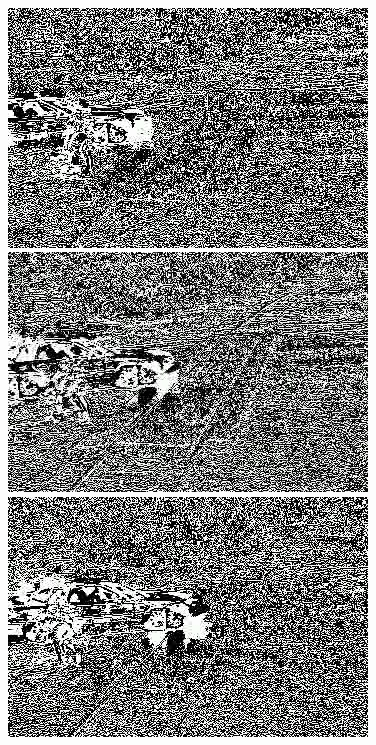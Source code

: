 \documentclass[a4paper]{ctexart}
\begin{document}
\begin{figure}[htbp]
\begin{minipage}[t]{0.2\textwidth}
	\end{minipage}\\
	\begin{minipage}[t]{0.2\textwidth}
		\centering
		\includegraphics[width=\textwidth]{figure/frames/sb3400.jpg}
	\end{minipage}
	\begin{minipage}[t]{0.2\textwidth}
		\centering
		\includegraphics[width=\textwidth]{figure/frames/sb3405.jpg}
	\end{minipage}
	\begin{minipage}[t]{0.2\textwidth}
		\centering
		\includegraphics[width=\textwidth]{figure/frames/sb3410.jpg}

\end{minipage}
\end{figure}
\end{document}
